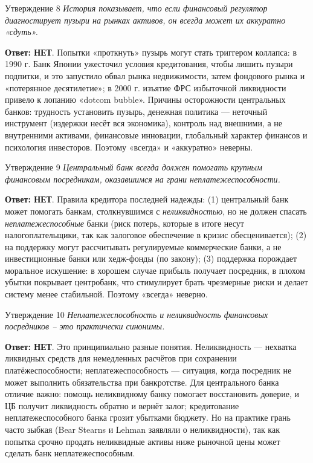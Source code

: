 \documentclass[10pt,a4paper]{article}
\newcommand{\qnet}{\textbf{\color{nored}Ответ: НЕТ}}
\newenvironment{answer}[2]{%
  \begin{qbox}{Утверждение #1}
  \textit{#2}\par\smallskip
}{%
  \end{qbox}\vspace{2pt}
}
\begin{document}
\begin{answer}{8}{История показывает, что если финансовый регулятор диагностирует пузыри на рынках активов, он всегда может их аккуратно «сдуть».}
\qnet. Попытки «проткнуть» пузырь могут стать триггером коллапса: в 1990 г. Банк Японии ужесточил условия кредитования, чтобы лишить пузыри подпитки, и это запустило обвал рынка недвижимости, затем фондового рынка и «потерянное десятилетие»; в 2000 г. изъятие ФРС избыточной ликвидности привело к лопанию «dotcom bubble». Причины осторожности центральных банков: трудность установить пузырь, денежная политика --- неточный инструмент (издержки несёт вся экономика), контроль над внешними, а не внутренними активами, финансовые инновации, глобальный характер финансов и психология инвесторов. Поэтому «всегда» и «аккуратно» неверны.
\end{answer}

\begin{answer}{9}{Центральный банк всегда должен помогать крупным финансовым посредникам, оказавшимся на грани неплатежеспособности.}
\qnet. Правила кредитора последней надежды: (1) центральный банк может помогать банкам, столкнувшимся с \emph{неликвидностью}, но не должен спасать \emph{неплатежеспособные} банки (риск потерь, которые в итоге несут налогоплательщики, так как залоговое обеспечение в кризис обесценивается); (2) на поддержку могут рассчитывать регулируемые коммерческие банки, а не инвестиционные банки или хедж-фонды (по закону); (3) поддержка порождает моральное искушение: в хорошем случае прибыль получает посредник, в плохом убытки покрывает центробанк, что стимулирует брать чрезмерные риски и делает систему менее стабильной. Поэтому «всегда» неверно.
\end{answer}

\begin{answer}{10}{Неплатежеспособность и неликвидность финансовых посредников -- это практически синонимы.}
\qnet. Это принципиально разные понятия. Неликвидность --- нехватка ликвидных средств для немедленных расчётов при сохранении платёжеспособности; неплатежеспособность --- ситуация, когда посредник не может выполнить обязательства при банкротстве. Для центрального банка отличие важно: помощь неликвидному банку помогает восстановить доверие, и ЦБ получит ликвидность обратно и вернёт залог; кредитование неплатежеспособного банка грозит убытками бюджету. Но на практике грань часто зыбкая (Bear Stearns и Lehman заявляли о неликвидности), так как попытка срочно продать неликвидные активы ниже рыночной цены может сделать банк неплатежеспособным.
\end{answer}
\end{document}
